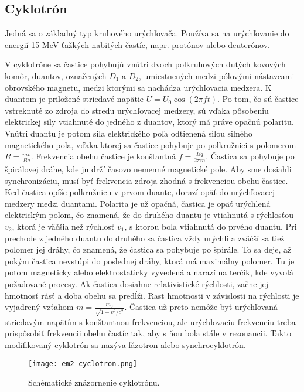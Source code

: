 \documentclass[../../main.tex]{subfiles}
\begin{document}
\subsection{Cyklotrón}

Jedná sa o základný typ kruhového urýchľovača. Používa sa na urýchľovanie do energií 15 MeV ťažkých nabitých častíc, napr. protónov alebo deuterónov. 

V cyklotróne sa častice pohybujú vnútri dvoch polkruhových dutých kovových komôr, duantov, označených $D_1$ a $D_2$, umiestnených medzi pólovými nástavcami obrovského magnetu, medzi ktorými sa nachádza urýchľovacia medzera. K duantom je priložené striedavé napätie $U=U_0\cos(2\pi ft)$. Po tom, čo sú častice vstreknuté zo zdroja do stredu urýchľovacej medzery, sú vďaka pôsobeniu elektrickej sily vtiahnuté do jedného z duantov, ktorý má práve opačnú polaritu. Vnútri duantu je potom sila elektrického poľa odtienená silou silného magnetického poľa, vďaka ktorej sa častice pohybuje po polkružnici s polomerom $R=\frac{mv}{Bq}$. Frekvencia obehu častice je konštantná $f=\frac{Bq}{2\pi m}$. Častica sa pohybuje po špirálovej dráhe, kde ju drží časovo nemenné magnetické pole. Aby sme dosiahli synchronizáciu, musí byť frekvencia zdroja zhodná s frekvenciou obehu častice. Keď častica opíše polkružnicu v prvom duante, dorazí opäť do urýchľovacej medzery medzi duantami. Polarita je už opačná, častica je opäť urýchlená elektrickým poľom, čo znamená, že do druhého duantu je vtiahnutá s rýchlosťou $v_2$, ktorá je väčšia než rýchlosť $v_1$, s ktorou bola vtiahnutá do prvého duantu. Pri prechode z jedného duantu do druhého sa častica vždy urýchli a zväčší sa tiež polomer jej dráhy, čo znamená, že častica sa pohybuje po špirále. To sa deje, až pokým častica nevstúpi do poslednej dráhy, ktorá má maximálny polomer. Tu je potom magneticky alebo elektrostaticky vyvedená a narazí na terčík, kde vyvolá požadované procesy. Ak častica dosiahne relativistické rýchlosti, začne jej hmotnosť rásť a doba obehu sa predĺži. Rast hmotnosti v závislosti na rýchlosti je vyjadrený vzťahom $m=\frac{m_0}{\sqrt{1-v^2/c^2}}$. Častica už preto nemôže byť urýchľovaná striedavým napätím s konštantnou frekvenciou, ale urýchlovaciu frekvenciu treba prispôsobiť frekvencii obehu častíc tak, aby s ňou bola stále v rezonancii. Takto modifikovaný cyklotrón sa nazýva fázotron alebo synchrocyklotrón. 

\begin{figure}[h]
\centering
\texttt{[image: em2-cyclotron.png]}
\caption{Schématické znázornenie cyklotrónu.}
\label{em2:img:cyclotron}
\end{figure}
\end{document}

